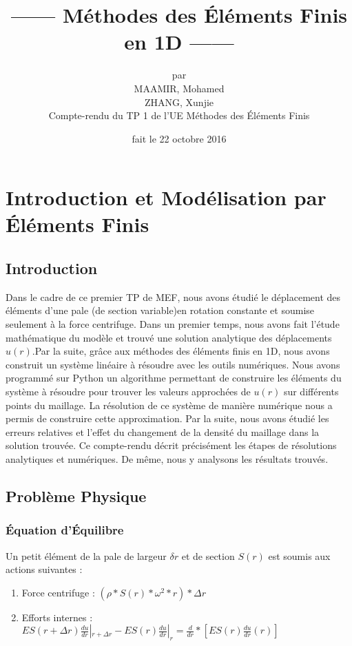 \documentclass[a4paper,10pt]{report} %
\title{------ Méthodes des Éléments Finis en 1D ------} %
\author{par\\MAAMIR, Mohamed\\ ZHANG, Xunjie\\ Compte-rendu du TP 1 de l'UE Méthodes des Éléments Finis} %
\date{fait le 22 octobre 2016} %
\begin{document}
\maketitle %
\tableofcontents %
\listoffigures %
\chapter{Introduction et Modélisation par Éléments Finis}

\section{Introduction}

Dans le cadre de ce premier TP de MEF, nous avons étudié le déplacement des éléments d'une pale (de section variable)en rotation constante et soumise seulement à la force centrifuge.
Dans un premier temps, nous avons fait l'étude mathématique du modèle et trouvé une solution analytique des déplacements $u(r)$.Par la suite, grâce aux méthodes des éléments finis en 1D, nous avons construit un système linéaire à résoudre avec les outils numériques.
Nous avons programmé sur Python un algorithme permettant de construire les éléments du système à résoudre pour trouver les valeurs approchées de $u(r)$ sur différents points du maillage. La résolution de ce système de manière numérique nous a permis de construire cette approximation.
Par la suite, nous avons étudié les erreurs relatives et l'effet du changement de la densité du maillage dans la solution trouvée.
Ce compte-rendu décrit précisément les étapes de résolutions analytiques et numériques. De même, nous y analysons les résultats trouvés.

\section{Problème Physique}

\subsection{Équation d'Équilibre}

Un petit élément de la pale de largeur $\delta r$ et de section $S(r)$ est soumis aux actions suivantes :
\begin{enumerate}
	\item Force centrifuge : $(\rho*S(r)*\omega^2*r)*\Delta r$
	\item Efforts internes : $ES(r+\Delta r)\frac{du}{dr}|_{r+\Delta r}-ES(r)\frac{du}{dr}|_{r}=\frac{d}{dr}*[ES(r)\frac{du}{dr}(r)]$
\end{enumerate}
\end{document}
